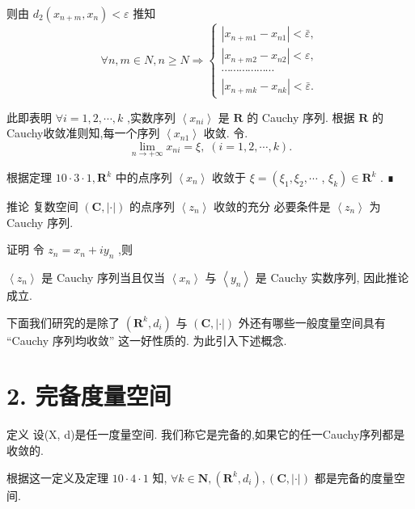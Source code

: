 则由 ${d}_{2}\left( {{x}_{n + m},{x}_{n}}\right)  < \varepsilon$ 推知
$$\forall n,m \in  N,n \geq  N \Rightarrow  \left\{  \begin{array}{l} \left| {{x}_{n + {m1}} - {x}_{n1}}\right|  < \bar{\varepsilon }, \\  \left| {{x}_{n + {m2}} - {x}_{n2}}\right|  < \varepsilon , \\  \cdots \cdots \cdots \cdots \cdots \cdots \\  \left| {{x}_{n + {mk}} - {x}_{nk}}\right|  < \bar{\varepsilon }. \end{array}\right.$$

此即表明 $\forall i = 1,2,\cdots ,k$ ,实数序列 $\left\langle  {x}_{ni}\right\rangle$ 是 $\mathbf{R}$ 的 Cauchy 序列. 根据 $\mathbf{R}$ 的Cauchy收敛准则知,每一个序列 $\left\langle  {x}_{n1}\right\rangle$ 收敛. 令.
$$\mathop{\lim }\limits_{{n \rightarrow   + \infty }}{x}_{ni} = \xi ,\;\left( {i = 1,2,\cdots ,k}\right) .$$

根据定理 ${10} \cdot  3 \cdot  1,{\mathbf{R}}^{k}$ 中的点序列 $\left\langle  {x}_{n}\right\rangle$ 收敛于 $\xi  = \left( {{\xi }_{1},{\xi }_{2},\cdots }\right.$ , $\left. {\xi }_{k}\right)  \in  {\mathbf{R}}^{k}$ . ∎

推论 复数空间 $\left( {\mathbf{C},\left| \cdot \right| }\right)$ 的点序列 $\left\langle  {z}_{n}\right\rangle$ 收敛的充分 必要条件是 $\left\langle  {z}_{n}\right\rangle$ 为 Cauchy 序列.

证明 令 ${z}_{n} = {x}_{n} + i{y}_{n}$ ,则

$\left\langle  {z}_{n}\right\rangle$ 是 Cauchy 序列当且仅当 $\left\langle  {x}_{n}\right\rangle$ 与 $\left\langle  {y}_{n}\right\rangle$ 是 Cauchy 实数序列, 因此推论成立.

下面我们研究的是除了 $\left( {{\mathbf{R}}^{k},{d}_{i}}\right)$ 与 $\left( {\mathbf{C},\left| \cdot \right| }\right)$ 外还有哪些一般度量空间具有 “Cauchy 序列均收敛” 这一好性质的. 为此引入下述概念.

\section*{2. 完备度量空间}

定义 设(X, d)是任一度量空间. 我们称它是完备的,如果它的任一Cauchy序列都是收敛的.

根据这一定义及定理 ${10} \cdot  4 \cdot  1$ 知, $\forall k \in  \mathbf{N},\left( {{\mathbf{R}}^{k},{d}_{i}}\right) ,\left( {\mathbf{C},\left| \cdot \right| }\right)$ 都是完备的度量空间.

